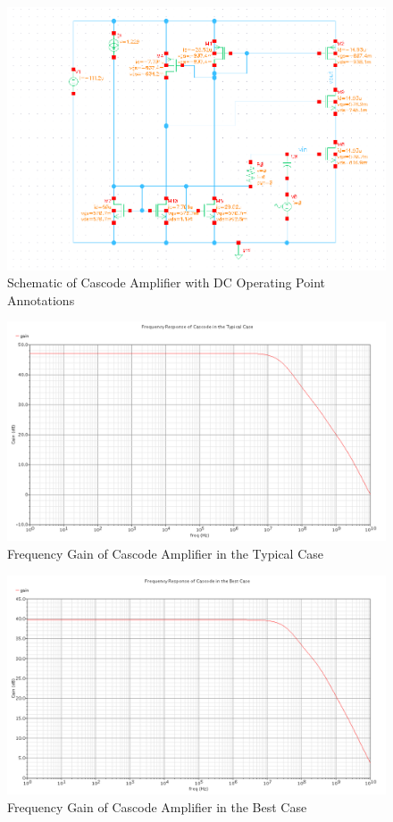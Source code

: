 \documentclass{article}
\begin{document}
\begin{figure}[H]
\centering
\includegraphics[width=7in]{2_cas_dcop.png}
\caption{Schematic of Cascode Amplifier with DC Operating Point Annotations}
\label{cas_dcop}
\end{figure}

\begin{figure}[H]
\centering
\includegraphics[width=5in]{2_cas_gain_tt.png}
\caption{Frequency Gain of Cascode Amplifier in the Typical Case}
\label{cas_tt}
\end{figure}

\begin{figure}[H]
\centering
\includegraphics[width=6in]{2_cas_gain_ff.png}
\caption{Frequency Gain of Cascode Amplifier in the Best Case}
\label{cas_ff}
\end{figure}
\end{document}
